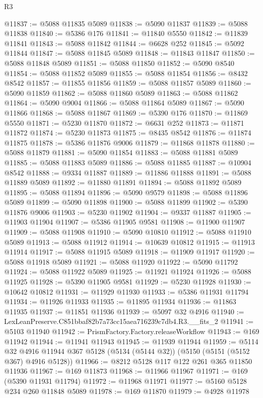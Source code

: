 \begin{lexlean}{R3}
\begin{coremodule}
@11837 := @5088 @11835 @5089
@11838 := @5090 @11837
@11839 := @5088 @11838
@11840 := @5386 @176
@11841 := @11840 @5550
@11842 := @11839 @11841
@11843 := @5088 @11842
@11844 := @6628 @252
@11845 := @5092 @11844
@11847 := @5088 @11845 @5089
@11848 := @11843 @11847
@11850 := @5088 @11848 @5089
@11851 := @5088 @11850
@11852 := @5090 @8540
@11854 := @5088 @11852 @5089
@11855 := @5088 @11854
@11856 := @8432 @8542
@11857 := @11855 @11856
@11859 := @5088 @11857 @5089
@11860 := @5090 @11859
@11862 := @5088 @11860 @5089
@11863 := @5088 @11862
@11864 := @5090 @9004
@11866 := @5088 @11864 @5089
@11867 := @5090 @11866
@11868 := @5088 @11867
@11869 := @5390 @176
@11870 := @11869 @5550
@11871 := @5230 @11870
@11872 := @6631 @252
@11873 := @11871 @11872
@11874 := @5230 @11873
@11875 := @8435 @8542
@11876 := @11874 @11875
@11878 := @5386 @11876 @9006
@11879 := @11868 @11878
@11880 := @5088 @11879
@11881 := @5090 @11854
@11883 := @5088 @11881 @5089
@11885 := @5088 @11883 @5089
@11886 := @5088 @11885
@11887 := @10904 @8542
@11888 := @9334 @11887
@11889 := @11886 @11888
@11891 := @5088 @11889 @5089
@11892 := @11880 @11891
@11894 := @5088 @11892 @5089
@11895 := @5088 @11894
@11896 := @5090 @9579
@11898 := @5088 @11896 @5089
@11899 := @5090 @11898
@11900 := @5088 @11899
@11902 := @5390 @11876 @9006
@11903 := @5230 @11902
@11904 := @9337 @11887
@11905 := @11903 @11904
@11907 := @5386 @11905 @9581
@11908 := @11900 @11907
@11909 := @5088 @11908
@11910 := @5090 @10810
@11912 := @5088 @11910 @5089
@11913 := @5088 @11912
@11914 := @10639 @10812
@11915 := @11913 @11914
@11917 := @5088 @11915 @5089
@11918 := @11909 @11917
@11920 := @5088 @11918 @5089
@11921 := @5088 @11920
@11922 := @5090 @11792
@11924 := @5088 @11922 @5089
@11925 := @11921 @11924
@11926 := @5088 @11925
@11928 := @5390 @11905 @9581
@11929 := @5230 @11928
@11930 := @10642 @10812
@11931 := @11929 @11930
@11933 := @5386 @11931 @11794
@11934 := @11926 @11933
@11935 := @11895 @11934
@11936 := @11863 @11935
@11937 := @11851 @11936
@11939 := @5097 @32 @4916
@11940 := LexLeanPreserve.C851bbaf82b7a73cc15aea716239c7db4.R3.__fits_2
@11941 := @5103 @11940
@11942 := PrismFactory.Factory.releaseWorkflow
@11943 := @169 @11942
@11944 := @11941 @11943
@11945 := @11939 @11944
@11959 := @5114
    @32
    @4916
    @11944
    @367
    @5128
    (@5134 (@5144 @32))
    (@5150 (@5151 (@5152 @367) @4916 @5128))
@11966 := @8212 @5128 @117 @122 @261 @365 @11850 @11936
@11967 := @169 @11873
@11968 := @11966 @11967
@11971 := @169 (@5390 @11931 @11794)
@11972 := @11968 @11971
@11977 := @5160 @5128 @234 @260 @11848 @5089
@11978 := @169 @11870
@11979 := @4928 @11978

\end{coremodule}
\end{lexlean}
